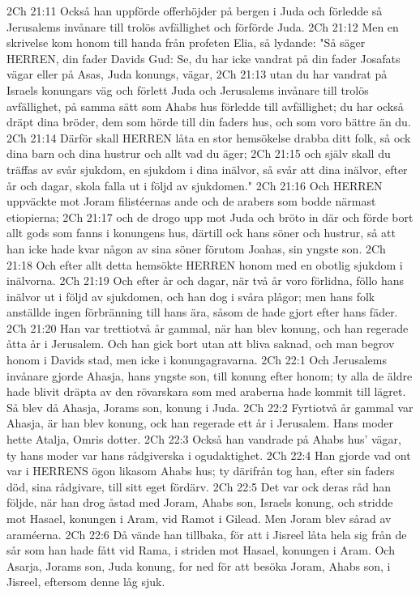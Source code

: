 2Ch 21:11  Också han uppförde offerhöjder på bergen i Juda och förledde så Jerusalems invånare till trolös avfällighet och förförde Juda.
2Ch 21:12  Men en skrivelse kom honom till handa från profeten Elia, så lydande: "Så säger HERREN, din fader Davids Gud: Se, du har icke vandrat på din fader Josafats vägar eller på Asas, Juda konungs, vägar,
2Ch 21:13  utan du har vandrat på Israels konungars väg och förlett Juda och Jerusalems invånare till trolös avfällighet, på samma sätt som Ahabs hus förledde till avfällighet; du har också dräpt dina bröder, dem som hörde till din faders hus, och som voro bättre än du.
2Ch 21:14  Därför skall HERREN låta en stor hemsökelse drabba ditt folk, så ock dina barn och dina hustrur och allt vad du äger;
2Ch 21:15  och själv skall du träffas av svår sjukdom, en sjukdom i dina inälvor, så svår att dina inälvor, efter år och dagar, skola falla ut i följd av sjukdomen."
2Ch 21:16  Och HERREN uppväckte mot Joram filistéernas ande och de arabers som bodde närmast etiopierna;
2Ch 21:17  och de drogo upp mot Juda och bröto in där och förde bort allt gods som fanns i konungens hus, därtill ock hans söner och hustrur, så att han icke hade kvar någon av sina söner förutom Joahas, sin yngste son.
2Ch 21:18  Och efter allt detta hemsökte HERREN honom med en obotlig sjukdom i inälvorna.
2Ch 21:19  Och efter år och dagar, när två år voro förlidna, föllo hans inälvor ut i följd av sjukdomen, och han dog i svåra plågor; men hans folk anställde ingen förbränning till hans ära, såsom de hade gjort efter hans fäder.
2Ch 21:20  Han var trettiotvå år gammal, när han blev konung, och han regerade åtta år i Jerusalem. Och han gick bort utan att bliva saknad, och man begrov honom i Davids stad, men icke i konungagravarna.
2Ch 22:1  Och Jerusalems invånare gjorde Ahasja, hans yngste son, till konung efter honom; ty alla de äldre hade blivit dräpta av den rövarskara som med araberna hade kommit till lägret. Så blev då Ahasja, Jorams son, konung i Juda.
2Ch 22:2  Fyrtiotvå år gammal var Ahasja, är han blev konung, ock han regerade ett år i Jerusalem. Hans moder hette Atalja, Omris dotter.
2Ch 22:3  Också han vandrade på Ahabs hus' vägar, ty hans moder var hans rådgiverska i ogudaktighet.
2Ch 22:4  Han gjorde vad ont var i HERRENS ögon likasom Ahabs hus; ty därifrån tog han, efter sin faders död, sina rådgivare, till sitt eget fördärv.
2Ch 22:5  Det var ock deras råd han följde, när han drog åstad med Joram, Ahabs son, Israels konung, och stridde mot Hasael, konungen i Aram, vid Ramot i Gilead. Men Joram blev sårad av araméerna.
2Ch 22:6  Då vände han tillbaka, för att i Jisreel låta hela sig från de sår som han hade fått vid Rama, i striden mot Hasael, konungen i Aram. Och Asarja, Jorams son, Juda konung, for ned för att besöka Joram, Ahabs son, i Jisreel, eftersom denne låg sjuk.
